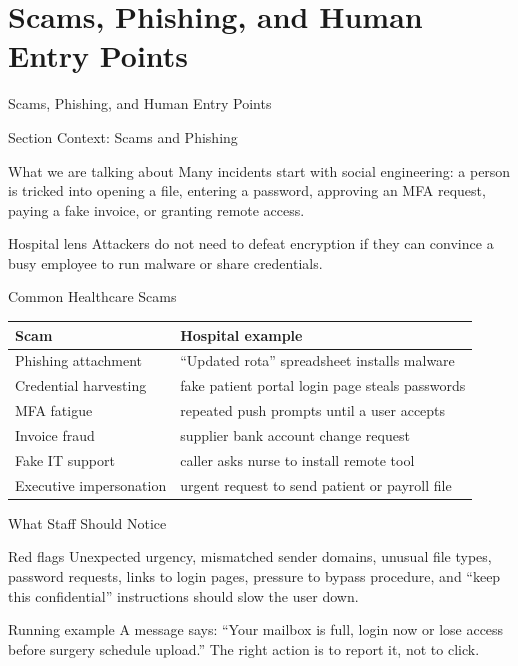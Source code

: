 \documentclass[presentation]{beamer}
\newcommand{\sectiontitleframe}[1]{
\begin{frame}[plain,c]
\begin{center}
{\usebeamerfont{title}\usebeamercolor[fg]{title}#1}
\end{center}
\end{frame}
}
\begin{document}
\section{Scams, Phishing, and Human Entry Points}
\sectiontitleframe{Scams, Phishing, and Human Entry Points}

\begin{frame}[c]{Section Context: Scams and Phishing}
\begin{block}{What we are talking about}
Many incidents start with social engineering: a person is tricked into opening a file, entering a
password, approving an MFA request, paying a fake invoice, or granting remote access.
\end{block}

\begin{exampleblock}{Hospital lens}
Attackers do not need to defeat encryption if they can convince a busy employee to run malware or
share credentials.
\end{exampleblock}
\end{frame}

\begin{frame}[c]{Common Healthcare Scams}
\small
\begin{tabularx}{\textwidth}{@{}p{}X@{}}
\toprule
\textbf{Scam} & \textbf{Hospital example} \\
\midrule
Phishing attachment & ``Updated rota'' spreadsheet installs malware \\
Credential harvesting & fake patient portal login page steals passwords \\
MFA fatigue & repeated push prompts until a user accepts \\
Invoice fraud & supplier bank account change request \\
Fake IT support & caller asks nurse to install remote tool \\
Executive impersonation & urgent request to send patient or payroll file \\
\bottomrule
\end{tabularx}
\end{frame}

\begin{frame}[c]{What Staff Should Notice}
\begin{block}{Red flags}
Unexpected urgency, mismatched sender domains, unusual file types, password requests, links to
login pages, pressure to bypass procedure, and ``keep this confidential'' instructions should slow
the user down.
\end{block}

\begin{exampleblock}{Running example}
A message says: ``Your mailbox is full, login now or lose access before surgery schedule upload.''
The right action is to report it, not to click.
\end{exampleblock}
\end{frame}
\end{document}
